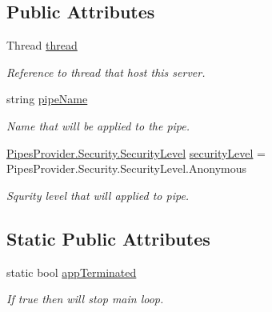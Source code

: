 \subsection*{Public Attributes}
\begin{DoxyCompactItemize}
\item 
Thread \mbox{\hyperlink{class_uniform_server_1_1_base_server_a52485a2d70e615a5cbf720c952a8d62f}{thread}}
\begin{DoxyCompactList}\small\item\em Reference to thread that host this server. \end{DoxyCompactList}\item 
string \mbox{\hyperlink{class_uniform_server_1_1_base_server_aaa318b3ed503dd8ccf381c9f3a81ecf2}{pipe\+Name}}
\begin{DoxyCompactList}\small\item\em Name that will be applied to the pipe. \end{DoxyCompactList}\item 
\mbox{\hyperlink{namespace_pipes_provider_1_1_security_a1a6020eca1c661a6f7140e8260502d7e}{Pipes\+Provider.\+Security.\+Security\+Level}} \mbox{\hyperlink{class_uniform_server_1_1_base_server_ac6297faa957fd1005fc61054bdd1cdb1}{security\+Level}} = Pipes\+Provider.\+Security.\+Security\+Level.\+Anonymous
\begin{DoxyCompactList}\small\item\em Squrity level that will applied to pipe. \end{DoxyCompactList}\end{DoxyCompactItemize}
\subsection*{Static Public Attributes}
\begin{DoxyCompactItemize}
\item 
static bool \mbox{\hyperlink{class_uniform_server_1_1_base_server_a632ed557976f4d7bd9b41502bb9a262b}{app\+Terminated}}
\begin{DoxyCompactList}\small\item\em If true then will stop main loop. \end{DoxyCompactList}\end{DoxyCompactItemize}
